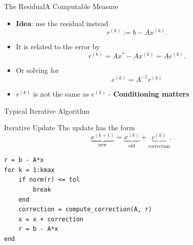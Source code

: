 \documentclass[10pt]{beamer}
\begin{document}

\begin{frame}{The Residual}{A Computable Measure}

\begin{itemize}
    \item \textbf{Idea}: use the residual instead
    \[
        r^{(k)} := b-Ax^{(k)}.
    \]

    \item It is related to the error by
    \[
        r^{(k)}
        = Ax^*-Ax^{(k)}
        = A e^{(k)}.
    \]
    \item Or solving for 
    $$
        e^{(k)}= A^{-1}r^{(k)}
    $$

    \item $r^{(k)}$ is not the same as $e^{(k)}$ - \textbf{Conditioning matters}
\end{itemize}

\end{frame}


\begin{frame}[fragile]{Typical Iterative Algorithm}

\begin{block}{Iterative Update}
  The update has the form
    \[
        \underbrace{x^{(k+1)}}_{\text{new}}
        =
        \underbrace{x^{(k)}}_{\text{old}}
        +
        \underbrace{c^{(k)}}_{\text{correction}}.
    \]
\end{block}

\begin{lstlisting}[mathescape]
r = b - A*x
for k = 1:kmax
    if norm(r) <= tol
        break
    end
    correction = compute_correction(A, r)
    x = x + correction
    r = b - A*x
end
\end{lstlisting}



\end{frame}

\end{document}
